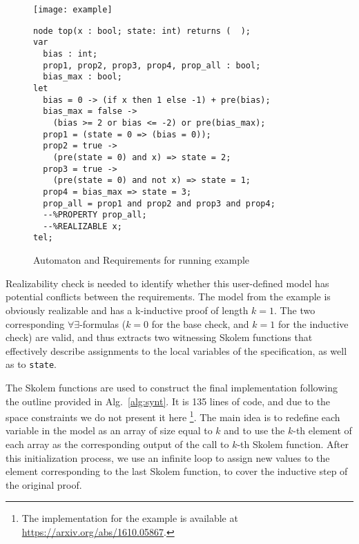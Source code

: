 \begin{figure}[H]
\begin{minipage}[c]{0.35\textwidth}
\centering
\texttt{[image: example]}
\end{minipage}
\begin{minipage}[c]{0.7\textwidth}
 \begin{Verbatim}[fontsize=\scriptsize]
node top(x : bool; state: int) returns (  );
var
  bias : int;
  prop1, prop2, prop3, prop4, prop_all : bool;
  bias_max : bool;
let
  bias = 0 -> (if x then 1 else -1) + pre(bias);
  bias_max = false ->
	(bias >= 2 or bias <= -2) or pre(bias_max);
  prop1 = (state = 0 => (bias = 0));
  prop2 = true ->
  	(pre(state = 0) and x) => state = 2;
  prop3 = true ->
  	(pre(state = 0) and not x) => state = 1;
  prop4 = bias_max => state = 3;
  prop_all = prop1 and prop2 and prop3 and prop4;
  --%PROPERTY prop_all;
  --%REALIZABLE x;
tel;
 \end{Verbatim}
\end{minipage}
\caption{Automaton and Requirements for running example}
\label{fg:example}
\end{figure}

Realizability check is needed to identify whether this user-defined model
 has potential conflicts between the requirements.
The model from the example is obviously realizable and has
a k-inductive proof of length $k = 1$.
The two corresponding $\forall\exists$-formulas ($k=0$ for
the base check, and $k=1$ for the inductive check) are valid, and thus  \aeval
extracts two witnessing Skolem functions
that effectively describe
 assignments to the local variables of the specification, as well as to \texttt{state}.

The Skolem functions are used to construct the final implementation
following the outline provided in Alg.~\ref{alg:synt}. 
It is 135 lines of code, and due to the space constraints we do not
present it here%
\footnote{The implementation for the
example is available at \url{https://arxiv.org/abs/1610.05867}.}.
The main idea is to redefine each variable in the model 
as an array of size equal to $k$ and
to use the $k$-th element of each array as the corresponding output of the call
to $k$-th Skolem function. After this initialization process, we use an infinite
loop to assign new values to the element corresponding to the last Skolem
function, to cover the inductive step of the original proof.
